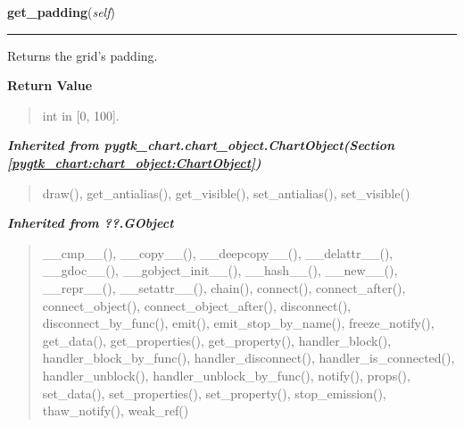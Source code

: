     \label{pygtk_chart:bar_chart:Grid:get_padding}

    \vspace{0.5ex}

\hspace{.8\funcindent}\begin{boxedminipage}{\funcwidth}

    \raggedright \textbf{get\_padding}(\textit{self})

    \vspace{-1.5ex}

    \rule{\textwidth}{0.5\fboxrule}
\setlength{\parskip}{2ex}
    Returns the grid's padding.

\setlength{\parskip}{1ex}
      \textbf{Return Value}
    \vspace{-1ex}

      \begin{quote}
      int in [0, 100].

      \end{quote}

    \end{boxedminipage}


\large{\textbf{\textit{Inherited from pygtk\_chart.chart\_object.ChartObject\textit{(Section \ref{pygtk_chart:chart_object:ChartObject})}}}}

\begin{quote}
draw(), get\_antialias(), get\_visible(), set\_antialias(), set\_visible()
\end{quote}

\large{\textbf{\textit{Inherited from ??.GObject}}}

\begin{quote}
\_\_cmp\_\_(), \_\_copy\_\_(), \_\_deepcopy\_\_(), \_\_delattr\_\_(), \_\_gdoc\_\_(), \_\_gobject\_init\_\_(), \_\_hash\_\_(), \_\_new\_\_(), \_\_repr\_\_(), \_\_setattr\_\_(), chain(), connect(), connect\_after(), connect\_object(), connect\_object\_after(), disconnect(), disconnect\_by\_func(), emit(), emit\_stop\_by\_name(), freeze\_notify(), get\_data(), get\_properties(), get\_property(), handler\_block(), handler\_block\_by\_func(), handler\_disconnect(), handler\_is\_connected(), handler\_unblock(), handler\_unblock\_by\_func(), notify(), props(), set\_data(), set\_properties(), set\_property(), stop\_emission(), thaw\_notify(), weak\_ref()
\end{quote}

